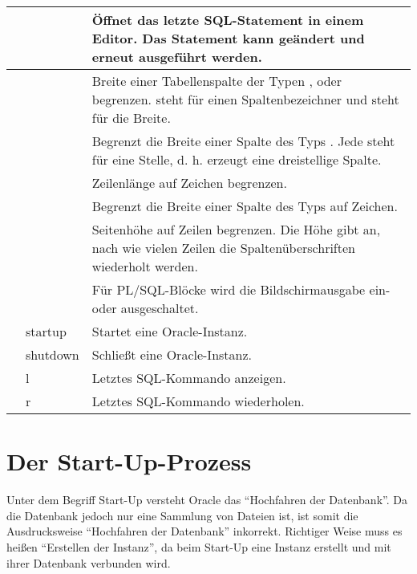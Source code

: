 \begin{center}
\begin{small}
\begin{supertabular}{|p{4.25cm}|p{4.25cm}|p{6.25cm}|}
              \hline
               &  & Öffnet das letzte SQL-Statement in einem Editor. Das Statement kann geändert und erneut ausgeführt werden. \\
              \hline
               &  & Breite einer Tabellenspalte der Typen ,  oder  begrenzen.  steht für einen Spaltenbezeichner und  steht für die Breite. \\
              \hline
               &  & Begrenzt die Breite einer Spalte des Typs . Jede  steht für eine Stelle, d. h.  erzeugt eine dreistellige Spalte. \\
              \hline
               &  & Zeilenlänge auf  Zeichen begrenzen. \\
              \hline
               &  & Begrenzt die Breite einer Spalte des Typs  auf  Zeichen. \\
              \hline
               &  & Seitenhöhe auf  Zeilen begrenzen. Die Höhe gibt an, nach wie vielen Zeilen die Spaltenüberschriften wiederholt werden. \\
              \hline
               &  & Für PL/SQL-Blöcke wird die Bild\-schirm\-ausgabe ein- oder ausgeschaltet.\\
              \hline
               & startup & Startet eine Oracle-Instanz. \\
              \hline
               & shutdown & Schließt eine Oracle-Instanz. \\
              \hline
               & l & Letztes SQL-Kommando anzeigen. \\
              \hline
               & r & Letztes SQL-Kommando wiederholen. \\
           \end{supertabular}
          \end{small}
        \end{center}
    \section{Der Start-Up-Prozess}
      Unter dem Begriff Start-Up versteht Oracle das \enquote{Hochfahren der Datenbank}. Da die Datenbank jedoch nur eine Sammlung von Dateien ist, ist somit die Ausdrucksweise \enquote{Hochfahren der Datenbank} inkorrekt. Richtiger Weise muss es heißen \enquote{Erstellen der Instanz}, da beim Start-Up eine Instanz erstellt und mit ihrer Datenbank verbunden wird.

